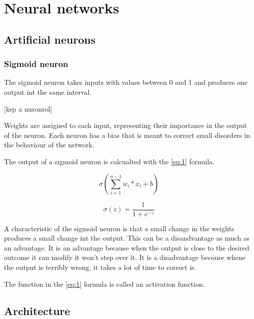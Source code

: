 \chapter{Neural networks}\label{ch:INTRO}

\section{Artificial neurons}\label{sec:INTRO:neurons}

\subsection{Sigmoid neuron}

The sigmoid neuron takes inputs with values between 0 and 1 and produces one output int the same interval.

[kep a nuronrol]

Weights are assigned to each input, representing their importance in the output of the neuron. Each neuron has a bias that is meant to correct small disorders in the behaviour of the network.

The output of a sigmoid neuron is calcualted with the \ref{eq:1} formula.

\begin{equation} \label{eq:1}
\sigma(\sum\limits_{i=1}^{n-1} w_{i}*x_{i} + b)
\end{equation}

\begin{equation} \label{eq:2}
\sigma(z) = \frac{1}{1+e^{-z}}
\end{equation}

A characteristic of the sigmoid neuron is that a small change in the weights produces a small change int the output. This can be a disandvantage as much as an advantage. It is an advantage because when the output is close to the desired outcome it can modify it won't step over it. It is a disadvantage becouse whene the output is terribly wrong, it takes a lot of time to correct is.

The function in the \ref{eq:1} formula is called an activation function.

\section{Architecture}\label{sec:INTRO:architecture}


